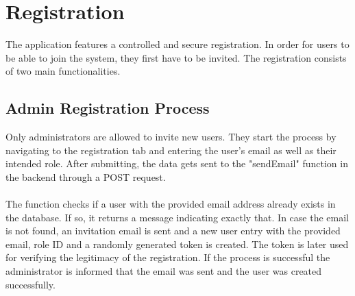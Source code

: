 \documentclass[a4paper,12pt]{report}
\begin{document}
\section{Registration}
The application features a controlled and secure registration. In order for users to be able to join the system, they first have to be invited. The registration consists of two main functionalities.
\subsection{Admin Registration Process}
Only administrators are allowed to invite new users. They start the process by navigating to the registration tab and entering the user's email as well as their intended role. After submitting, the data gets sent to the "sendEmail" function in the backend through a POST request.\\\\
The function checks if a user with the provided email address already exists in the database. If so, it returns a message indicating exactly that. In case the email is not found, an invitation email is sent and a new user entry with the provided email, role ID and a randomly generated token is created. The token is later used for verifying the legitimacy of the registration. If the process is successful the administrator is informed that the email was sent and the user was created successfully.
\end{document}
